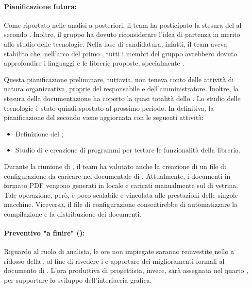 \paragraph*{Pianificazione futura:}
\par Come riportato nelle analisi a posteriori, il team ha posticipato la stesura del  al secondo . Inoltre, il gruppo ha dovuto riconsiderare l’idea di partenza in merito allo studio delle tecnologie. Nella fase di candidatura, infatti, il team aveva stabilito che, nell’arco del primo , tutti i membri del gruppo avrebbero dovuto approfondire i linguaggi e le librerie proposte, specialmente .

\vspace{0.5\baselineskip}
\par Questa pianificazione preliminare, tuttavia, non teneva conto delle attività di natura organizzativa, proprie del responsabile e dell’amministratore. Inoltre, la stesura della documentazione ha coperto la quasi totalità dello . Lo studio delle tecnologie è stato quindi spostato al prossimo periodo. In definitiva, la pianificazione del secondo  viene aggiornata con le seguenti attività:
\begin{itemize}
  \item Definizione del ;
  \item Studio di  e creazione di programmi per testare le funzionalità della libreria.
\end{itemize}

\vspace{0.5\baselineskip}
\par Durante la riunione di , il team ha valutato anche la creazione di un file di configurazione da caricare nel  documentale di . Attualmente, i documenti in formato PDF vengono generati in locale e caricati manualmente sul  di vetrina. Tale operazione, però, è poco scalabile e vincolata alle prestazioni delle singole macchine. Viceversa, il file di configurazione consentirebbe di automatizzare la compilazione e la distribuzione dei documenti.


\paragraph*{Preventivo "a finire" ():}
\par Riguardo al ruolo di analista, le ore non impiegate saranno reinvestite nello  a ridosso della , al fine di rivedere i  e apportare dei miglioramenti formali al documento di \AdR. L'ora produttiva di progettista, invece, sarà assegnata nel quarto , per supportare lo sviluppo dell'interfaccia grafica.

